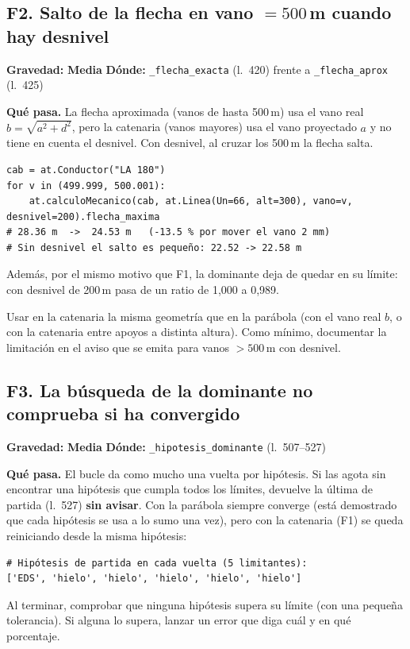 \documentclass[11pt,a4paper]{article}
\newcommand{\media}{\textcolor{media}{\textbf{Media}}}
\newcommand{\code}[1]{\texttt{#1}}
\newcommand{\fallo}[4]{%
  \subsection[#1. #2]{#1. #2}
  \noindent\textbf{Gravedad:} #3 \quad \textbf{Dónde:} #4\par\medskip}
\begin{document}
\fallo{F2}{Salto de la flecha en vano $=500$\,m cuando hay desnivel}{\media}{\code{\_flecha\_exacta} (l.~420) frente a \code{\_flecha\_aprox} (l.~425)}

\textbf{Qué pasa.} La flecha aproximada (vanos de hasta 500\,m) usa el vano real $b=\sqrt{a^2+d^2}$, pero la catenaria (vanos mayores) usa el vano proyectado $a$ y no tiene en cuenta el desnivel. Con desnivel, al cruzar los 500\,m la flecha salta.

\begin{lstlisting}
cab = at.Conductor("LA 180")
for v in (499.999, 500.001):
    at.calculoMecanico(cab, at.Linea(Un=66, alt=300), vano=v, desnivel=200).flecha_maxima
# 28.36 m  ->  24.53 m   (-13.5 % por mover el vano 2 mm)
# Sin desnivel el salto es pequeño: 22.52 -> 22.58 m
\end{lstlisting}

Además, por el mismo motivo que F1, la dominante deja de quedar en su límite: con desnivel de 200\,m pasa de un ratio de 1,000 a 0,989.

\begin{arreglo}
Usar en la catenaria la misma geometría que en la parábola (con el vano real $b$, o con la catenaria entre apoyos a distinta altura). Como mínimo, documentar la limitación en el aviso que se emita para vanos $>500$\,m con desnivel.
\end{arreglo}

\fallo{F3}{La búsqueda de la dominante no comprueba si ha convergido}{\media}{\code{\_hipotesis\_dominante} (l.~507--527)}

\textbf{Qué pasa.} El bucle da como mucho una vuelta por hipótesis. Si las agota sin encontrar una hipótesis que cumpla todos los límites, devuelve la última de partida (l.~527) \textbf{sin avisar}. Con la parábola siempre converge (está demostrado que cada hipótesis se usa a lo sumo una vez), pero con la catenaria (F1) se queda reiniciando desde la misma hipótesis:
\begin{lstlisting}
# Hipótesis de partida en cada vuelta (5 limitantes):
['EDS', 'hielo', 'hielo', 'hielo', 'hielo', 'hielo']
\end{lstlisting}

\begin{arreglo}
Al terminar, comprobar que ninguna hipótesis supera su límite (con una pequeña tolerancia). Si alguna lo supera, lanzar un error que diga cuál y en qué porcentaje.
\end{arreglo}
\end{document}
